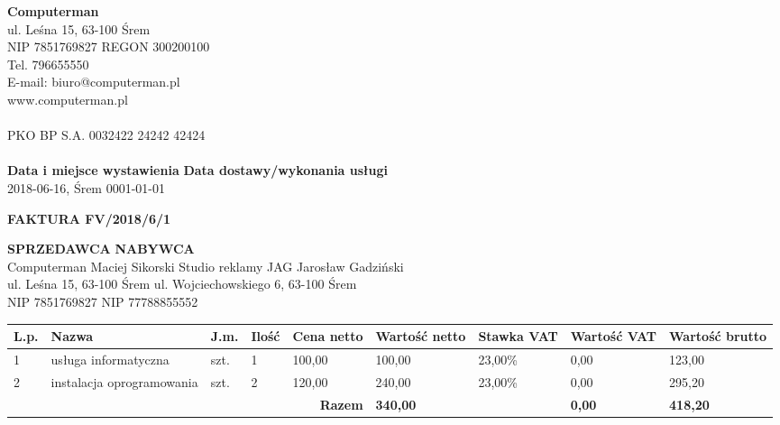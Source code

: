 \documentclass[a4paper,10pt]{article}
\date{}
\begin{document}
    \noindent
    \textbf{Computerman}\\
    ul. Leśna 15, 63-100 Śrem\\
    NIP 7851769827 REGON 300200100\\
    Tel. 796655550\\
    E-mail: biuro@computerman.pl\\
    www.computerman.pl\\
    \\
    PKO BP S.A.
    0032422 24242 42424\\
    \\
  
\noindent
    \textbf{Data i miejsce wystawienia}		\hfill \textbf{Data dostawy/wykonania usługi}\\
    2018-06-16, Śrem							        \hfill	0001-01-01\\
  
    \begin{center}
    \textbf{\huge{FAKTURA FV/2018/6/1}}
    \end{center}
    \vspace{2cm}
  
    \noindent
    \textbf{SPRZEDAWCA}						\hfill \textbf{NABYWCA}\\
    Computerman Maciej Sikorski					                        \hfill Studio reklamy JAG Jarosław Gadziński\\
    ul. Leśna 15, 63-100 Śrem								            \hfill ul. Wojciechowskiego 6, 63-100 Śrem\\
    NIP 7851769827								        \hfill NIP 77788855552\\
  
    \begin{table}[H]
    \raggedleft
    \begin{tabular}{| p{} | p{}  | p{} | p{}| p{} | p{} | p{} | p{} | p{} |}
    \hline
    \textbf{L.p.} & \textbf{Nazwa} & \textbf{J.m.} & \textbf{Ilość} & \textbf{Cena netto} & \textbf{Wartość netto} & \textbf{Stawka VAT} & \textbf{Wartość VAT} & \textbf{Wartość brutto} \\ \hline
  
    1 & usługa informatyczna & szt. & 1 & 100,00 & 100,00 & 23,00\% & 0,00 & 123,00 \\ \hline
  
    2 & instalacja oprogramowania & szt. & 2 & 120,00 & 240,00 & 23,00\% & 0,00 & 295,20 \\ \hline
  
    \hline
    \multicolumn{5}{|r|}{\textbf{Razem}} & \textbf{340,00} & \cellcolor[gray]{0.9} & \textbf{0,00} & \textbf{418,20} \\ \hline
    \end{tabular}
    \end{table}
  
\end{document}
